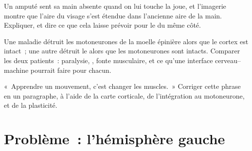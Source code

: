 \begin{exercise}[$\star\star\star$]\label{exo:g12:brain-and-movement:13}
Un amputé sent sa main absente quand on lui touche la joue, et
l'imagerie montre que l'aire du visage s'est étendue dans l'ancienne
aire de la main. Expliquer, et dire ce que cela laisse prévoir pour le
 du même côté.
\end{exercise}

\begin{exercise}[$\star\star\star$]\label{exo:g12:brain-and-movement:14}
Une maladie détruit les motoneurones de la moelle épinière alors que
le cortex est intact~; une autre détruit le  alors que
les motoneurones sont intacts. Comparer les deux patients~: paralysie,
, fonte musculaire, et ce qu'une interface cerveau--machine
pourrait faire pour chacun.
\end{exercise}

\begin{exercise}[$\star\star\star$]\label{exo:g12:brain-and-movement:15}
«~Apprendre un mouvement, c'est changer les muscles.~» Corriger cette
phrase en un paragraphe, à l'aide de la carte corticale, de
l'intégration au motoneurone, et de la plasticité.
\end{exercise}

\section{Problème~: l'hémisphère gauche}

